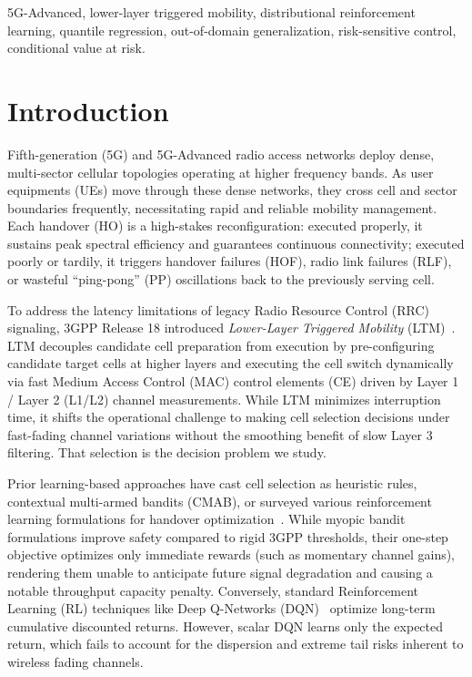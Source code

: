 \documentclass{ieeetmlcn}
\begin{document}
\begin{IEEEkeywords}
5G-Advanced, lower-layer triggered mobility, distributional reinforcement learning, quantile regression, out-of-domain generalization, risk-sensitive control, conditional value at risk.
\end{IEEEkeywords}

\maketitle

\section{Introduction}

Fifth-generation (5G) and 5G-Advanced radio access networks deploy dense, multi-sector cellular topologies operating at higher frequency bands. As user equipments (UEs) move through these dense networks, they cross cell and sector boundaries frequently, necessitating rapid and reliable mobility management. Each handover (HO) is a high-stakes reconfiguration: executed properly, it sustains peak spectral efficiency and guarantees continuous connectivity; executed poorly or tardily, it triggers handover failures (HOF), radio link failures (RLF), or wasteful ``ping-pong'' (PP) oscillations back to the previously serving cell.

To address the latency limitations of legacy Radio Resource Control (RRC) signaling, 3GPP Release 18 introduced \emph{Lower-Layer Triggered Mobility} (LTM)~\cite{eric2024}. LTM decouples candidate cell preparation from execution by pre-configuring candidate target cells at higher layers and executing the cell switch dynamically via fast Medium Access Control (MAC) control elements (CE) driven by Layer 1 / Layer 2 (L1/L2) channel measurements. While LTM minimizes interruption time, it shifts the operational challenge to making cell selection decisions under fast-fading channel variations without the smoothing benefit of slow Layer 3 filtering. That selection is the decision problem we study.

Prior learning-based approaches have cast cell selection as heuristic rules, contextual multi-armed bandits (CMAB), or surveyed various reinforcement learning formulations for handover optimization~\cite{alraih2022}. While myopic bandit formulations improve safety compared to rigid 3GPP thresholds, their one-step objective optimizes only immediate rewards (such as momentary channel gains), rendering them unable to anticipate future signal degradation and causing a notable throughput capacity penalty. Conversely, standard Reinforcement Learning (RL) techniques like Deep Q-Networks (DQN)~\cite{dqn} optimize long-term cumulative discounted returns. However, scalar DQN learns only the expected return, which fails to account for the dispersion and extreme tail risks inherent to wireless fading channels.
\end{document}
